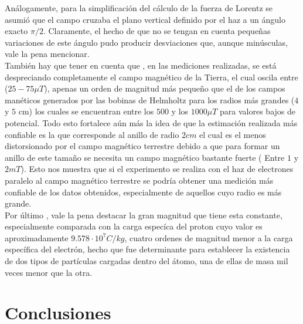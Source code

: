 \documentclass[prb,aps,twocolumn,preprintnumbers,amsmath,amssymb]{revtex4}
\begin{document}
Análogamente, para la simplificación del cálculo de la fuerza de Lorentz se asumió que el campo cruzaba el plano vertical definido por el haz a un ángulo exacto $ \pi /2 $. Claramente, el hecho de que no se tengan en cuenta pequeñas variaciones de este ángulo pudo producir desviaciones que, aunque minúsculas, vale la pena mencionar. \\

También hay que tener en cuenta que , en las mediciones realizadas, se está despreciando completamente el campo magnético de la Tierra, el cual oscila entre ($25-75 \mu T$), apenas un orden de magnitud más pequeño que el de los campos manéticos generados por las bobinas de Helmholtz para los radios más grandes ($4$ y $5$ cm) los cuales se encuentran entre los $500$ y los $1000 \mu T$ para valores bajos de potencial. Todo esto fortalece aún más la idea de que la estimación realizada más confiable es la que corresponde al anillo de radio $2cm$ el cual  es el menos distorsionado por el campo magnético terrestre debido a que para formar un anillo de este tamaño se necesita un campo magnético bastante fuerte ( Entre $1$ y $2 mT$). Esto nos muestra que si el experimento se realiza con el haz de electrones paralelo al campo magnético terrestre se podría obtener una medición más confiable de los datos obtenidos, especialmente de aquellos cuyo radio es más grande. \\

Por último , vale la pena destacar la gran magnitud que tiene esta constante, especialmente comparada con la carga especíca del proton cuyo valor es aproximadamente $9.578 \cdot 10^7 C/kg$, cuatro ordenes de magnitud menor a la carga específica del electrón, hecho que fue determinante para establecer la existencia de dos tipos de partículas cargadas dentro del átomo, una de ellas de masa mil veces menor que la otra.\\


\section{Conclusiones}
\end{document}
